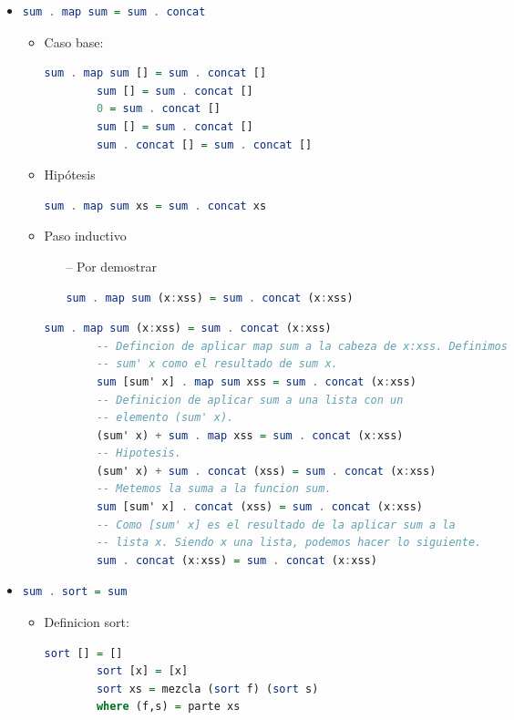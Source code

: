 \documentclass[spanish,12pt,letterpaper]{article}
\begin{document}
\begin{itemize}
  \item
    \begin{lstlisting}[language=Haskell]
      sum . map sum = sum . concat \end{lstlisting}
    \begin{itemize}
    \item Caso base:
      \begin{lstlisting}[language=Haskell]
        sum . map sum [] = sum . concat []
        sum [] = sum . concat []
        0 = sum . concat []
        sum [] = sum . concat []
        sum . concat [] = sum . concat [] \end{lstlisting}
    \item Hipótesis
      \begin{lstlisting}[language=Haskell]
        sum . map sum xs = sum . concat xs \end{lstlisting}
    \item Paso inductivo
      \begin{itemize}
      \item [--] Por demostrar
        \begin{lstlisting}[language=Haskell]
          sum . map sum (x:xss) = sum . concat (x:xss) \end{lstlisting}
      \end{itemize}
      \begin{lstlisting}[language=Haskell]
        sum . map sum (x:xss) = sum . concat (x:xss)
        -- Defincion de aplicar map sum a la cabeza de x:xss. Definimos
        -- sum' x como el resultado de sum x.
        sum [sum' x] . map sum xss = sum . concat (x:xss)
        -- Definicion de aplicar sum a una lista con un
        -- elemento (sum' x).
        (sum' x) + sum . map xss = sum . concat (x:xss)
        -- Hipotesis.
        (sum' x) + sum . concat (xss) = sum . concat (x:xss)
        -- Metemos la suma a la funcion sum.
        sum [sum' x] . concat (xss) = sum . concat (x:xss)
        -- Como [sum' x] es el resultado de la aplicar sum a la
        -- lista x. Siendo x una lista, podemos hacer lo siguiente.
        sum . concat (x:xss) = sum . concat (x:xss)\end{lstlisting}
    \end{itemize}

  \item
    \begin{lstlisting}[language=Haskell]
      sum . sort = sum \end{lstlisting}
    \begin{itemize}
    \item Definicion sort:
      \begin{lstlisting}[language=Haskell]
        sort [] = []
        sort [x] = [x]
        sort xs = mezcla (sort f) (sort s)
        where (f,s) = parte xs\end{lstlisting}


\end{itemize}
\end{itemize}
\end{document}
